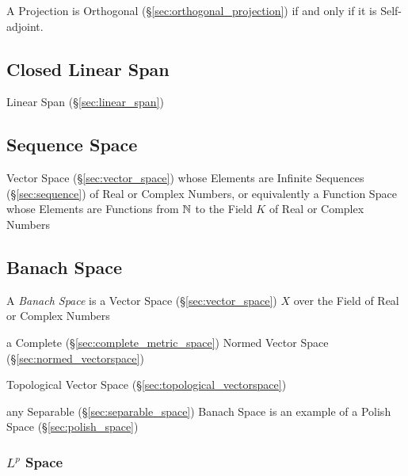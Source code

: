 A Projection is Orthogonal (\S\ref{sec:orthogonal_projection}) if and only if
it is Self-adjoint.



\subsection{Closed Linear Span}\label{sec:closed_linear_span}

Linear Span (\S\ref{sec:linear_span})



\subsection{Sequence Space}\label{sec:sequence_space}

Vector Space (\S\ref{sec:vector_space}) whose Elements are Infinite Sequences
(\S\ref{sec:sequence}) of Real or Complex Numbers, or equivalently a Function
Space whose Elements are Functions from $\mathbb{N}$ to the Field $K$ of Real or
Complex Numbers



\subsection{Banach Space}\label{sec:banach_space}

A \emph{Banach Space} is a Vector Space (\S\ref{sec:vector_space}) $X$ over the
Field of Real or Complex Numbers

a Complete (\S\ref{sec:complete_metric_space}) Normed Vector Space
(\S\ref{sec:normed_vectorspace})

Topological Vector Space (\S\ref{sec:topological_vectorspace})

any Separable (\S\ref{sec:separable_space}) Banach Space is an example of a
Polish Space (\S\ref{sec:polish_space})



\subsubsection{$L^p$ Space}\label{sec:lp_space}

